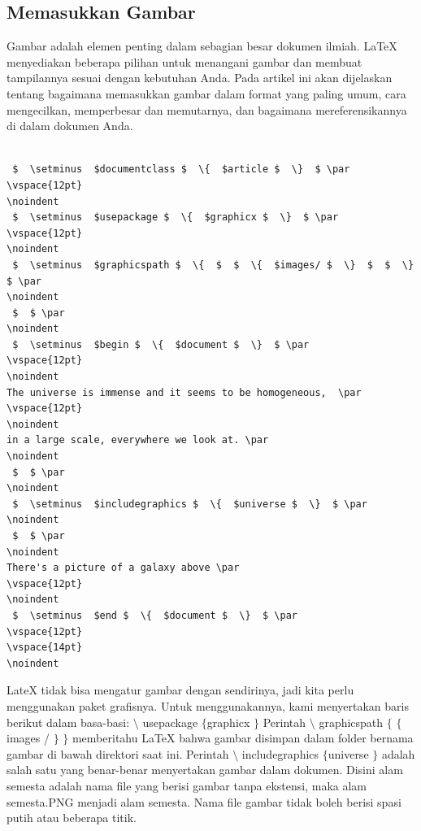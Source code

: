 \subsection {Memasukkan Gambar}
{\fontsize{10pt}{10pt}\selectfont  \hspace*{0.64in} Gambar adalah elemen penting dalam sebagian besar dokumen ilmiah. LaTeX menyediakan beberapa pilihan untuk menangani gambar dan membuat tampilannya sesuai dengan kebutuhan Anda. Pada artikel ini akan dijelaskan tentang  bagaimana memasukkan gambar dalam format yang paling umum, cara mengecilkan, memperbesar dan memutarnya, dan bagaimana mereferensikannya di dalam dokumen Anda.} \par
\vspace{12pt}
\noindent
\begin{verbatim}

 $  \setminus  $documentclass $  \{  $article $  \}  $ \par
\vspace{12pt}
\noindent
 $  \setminus  $usepackage $  \{  $graphicx $  \}  $ \par
\vspace{12pt}
\noindent
 $  \setminus  $graphicspath $  \{  $  $  \{  $images/ $  \}  $  $  \}  $ \par
\noindent
 $  $ \par
\noindent
 $  \setminus  $begin $  \{  $document $  \}  $ \par
\vspace{12pt}
\noindent
The universe is immense and it seems to be homogeneous,  \par
\vspace{12pt}
\noindent
in a large scale, everywhere we look at. \par
\noindent
 $  $ \par
\noindent
 $  \setminus  $includegraphics $  \{  $universe $  \}  $ \par
\noindent
 $  $ \par
\noindent
There's a picture of a galaxy above \par
\vspace{12pt}
\noindent
 $  \setminus  $end $  \{  $document $  \}  $ \par
\vspace{12pt}
\vspace{14pt}
\noindent
\end{verbatim}
 \hspace*{0.5in} LateX tidak bisa mengatur gambar dengan sendirinya, jadi kita perlu menggunakan paket grafisnya. Untuk menggunakannya, kami menyertakan baris berikut dalam basa-basi:  $  \setminus  $ usepackage  $  \{  $graphicx $  \}  $ Perintah  $  \setminus  $ graphicspath  $  \{  $ $  \{  $images / $  \}  $ $  \}  $ memberitahu LaTeX bahwa gambar disimpan dalam folder bernama gambar di bawah direktori saat ini. Perintah  $  \setminus  $ includegraphics  $  \{  $universe $  \}  $ adalah salah satu yang benar-benar menyertakan gambar dalam dokumen. Disini alam semesta adalah nama file yang berisi gambar tanpa ekstensi, maka alam semesta.PNG menjadi alam semesta. Nama file gambar tidak boleh berisi spasi putih atau beberapa titik. \par
